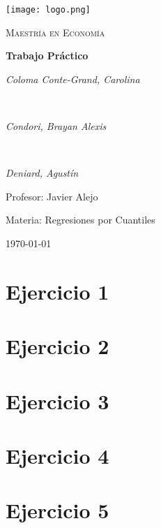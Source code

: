 \documentclass[12pt]{article}
\begin{document}
   

\renewcommand{\BOthers}[1]{et al.\hbox{}} 


\begin{titlepage}
    \centering
    \vspace*{2cm}
    \texttt{[image: logo.png]}\par
    \vspace{1cm}
    {\scshape\LARGE Maestría en Economía \par}
    \vspace{0.5cm}
    {\huge\bfseries
    Trabajo Práctico\par}
    \vspace{2cm}
    {\Large\itshape Coloma Conte-Grand, Carolina\par} \\
    
    {\Large\itshape Condori, Brayan Alexis\par} \\
    
    {\Large\itshape Deniard, Agustín\par}
    \vfill
    {\large Profesor: Javier Alejo\par}
    {\large Materia: Regresiones por Cuantiles\par}

    \vfill

    {\large \today\par}
\end{titlepage}

\justify 

\section*{Ejercicio 1}

\section*{Ejercicio 2}

\section*{Ejercicio 3}

\section*{Ejercicio 4}

\section*{Ejercicio 5}
\end{document}
